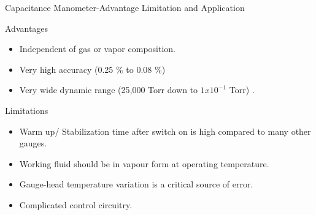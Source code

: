 \documentclass[11pt]{beamer}
\begin{document}
\begin{frame}{Capacitance Manometer-Advantage Limitation and Application}

       \begin{exampleblock}{Advantages}
          
          \begin{itemize}
           
           \item Independent of gas or vapor composition.
 
           \item Very high accuracy (0.25 \% to 0.08 \%)
           
           \item Very wide dynamic range (25,000 Torr down to $1 x 10^{-1} $ Torr) .
             
          \end{itemize}
        
       
       \end{exampleblock}
       
       \begin{exampleblock}{Limitations}
          \begin{itemize}
           
           \item Warm up/ Stabilization time after switch on is high compared to many other gauges.
 
           \item Working fluid should be in vapour form at operating temperature.
           
           \item Gauge-head temperature variation is a critical source of error. 
           
           \item Complicated control circuitry.
           
          \end{itemize}
        
       
       \end{exampleblock}



\end{frame}
\end{document}
